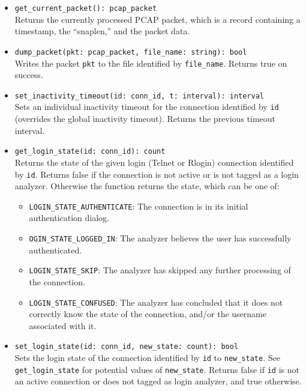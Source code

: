 \documentclass[10pt,landscape]{article}
\newcommand{\ReturnsTrueOnSuccess}{Returns true on success.\xspace}
\begin{document}
\begin{multicols*}{2}
\begin{itemize}
    Writes the current packet to the file identified by \verb|file_name|.
    \ReturnsTrueOnSuccess
  \item \verb|get_current_packet(): pcap_packet|\\
    Returns the currently processed PCAP packet, which is a record containing a
    timestamp, the ``snaplen,'' and the packet data.
  \item \verb|dump_packet(pkt: pcap_packet, file_name: string): bool|\\
    Writes the packet \verb|pkt| to the file identified by \verb|file_name|.
    \ReturnsTrueOnSuccess
  \item \verb|set_inactivity_timeout(id: conn_id, t: interval): interval|\\
    Sets an individual inactivity timeout for the connection identified by
    \texttt{id} (overrides the global inactivity timeout).
    Returns the previous timeout interval.
  \item \verb|get_login_state(id: conn_id): count|\\
    Returns the state of the given login (Telnet or Rlogin) connection
    identified by \texttt{id}. Returns false if the connection is not active
    or is not tagged as a login analyzer. Otherwise the function returns the
    state, which can be one of:
    \begin{itemize}
      \item \verb|LOGIN_STATE_AUTHENTICATE|: The connection is in its initial
        authentication dialog.
      \item \verb|OGIN_STATE_LOGGED_IN|: The analyzer believes the user has
        successfully authenticated.
      \item \verb|LOGIN_STATE_SKIP|: The analyzer has skipped any further
        processing of the connection.
      \item \verb|LOGIN_STATE_CONFUSED|: The analyzer has concluded that it
        does not correctly know the state of the connection, and/or the
        username associated with it.
    \end{itemize}
  \item \verb|set_login_state(id: conn_id, new_state: count): bool|\\
    Sets the login state of the connection identified by \verb|id| to
    \verb|new_state|. See \verb|get_login_state| for potential values of
    \verb|new_state|. Returns false if \texttt{id} is not an active connection
    or does not tagged as login analyzer, and true otherwise.
\end{itemize}


\end{multicols*}
\end{document}
